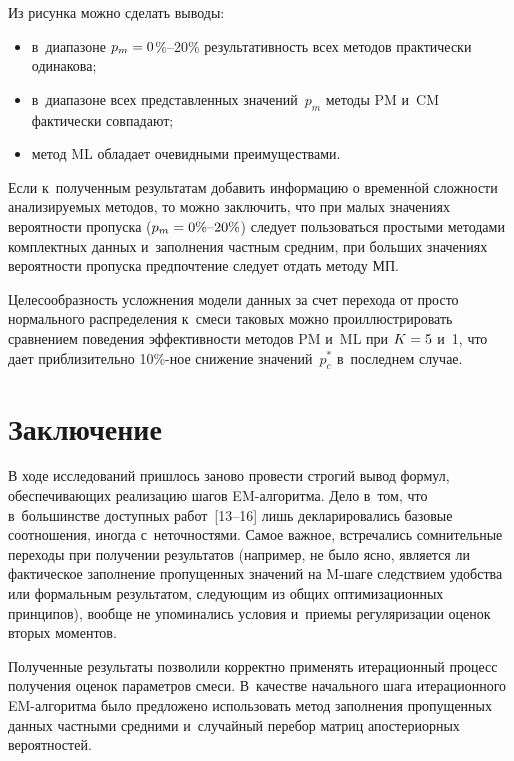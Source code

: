 \begin{multicols}{2}
     
     Из рисунка можно сделать выводы:
     \begin{itemize}
     \item в~диапазоне $p_m\hm=0$\%--20\% результативность всех методов 
практически одинакова;
\item в~диапазоне всех представленных значений~$p_m$ методы PM и~CM 
фактически совпадают;
\item метод ML обладает очевидными преимуще\-ст\-вами.
\end{itemize}

     Если к~полученным результатам добавить информацию о временн$\acute{\mbox{о}}$й 
сложности анализируемых методов, то можно заключить, что при малых 
значениях вероятности пропуска 
     ($p_m\hm=0\%\mbox{--}20\%$) следует пользоваться простыми методами 
комплектных данных и~заполнения частным средним, при больших значениях 
вероятности пропуска предпочтение следует отдать методу МП. 
     
     Целесообразность усложнения модели данных за счет перехода от просто 
нормального распределения к~смеси таковых можно проиллюстрировать 
сравнением поведения эффективности методов PM и~ML при $K\hm=5$ 
и~1, что дает приблизительно 10\%-ное снижение значений~$p_c^*$ 
в~последнем случае.

\section{Заключение}

     В ходе исследований пришлось заново про\-вес\-ти строгий вывод формул, 
обеспечивающих реа\-ли\-за\-цию шагов EM-ал\-го\-рит\-ма. 
%
Дело в~том, что %
в~большин\-ст\-ве доступных работ~[13--16] лишь декла\-ри\-ро\-ва\-лись базовые 
соотношения, иногда с~неточностями. Самое важное, встречались 
со\-мни\-тель\-ные переходы при получении ре\-зуль\-та\-тов (на\-при\-мер, не было ясно, 
является ли фактическое запол\-не\-ние пропущенных значений на %
\mbox{M-ша}\-ге 
следствием удобства или формальным ре\-зуль\-татом, следующим из общих 
оптимизационных принципов), вообще не упоминались условия и~приемы 
регуляризации оценок вторых моментов. 
     
     Полученные результаты позволили корректно применять итерационный 
процесс получения оценок параметров смеси. В~качестве начального шага 
итерационного EM-ал\-го\-рит\-ма было предложено использовать метод 
заполнения пропущенных данных частными средними и~случайный перебор 
матриц апостериорных вероятностей. 
     

\end{multicols}
